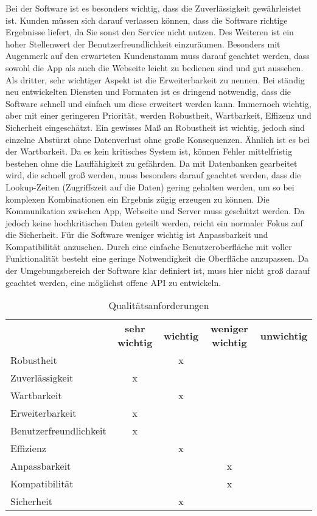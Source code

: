 ﻿Bei der Software ist es besonders wichtig, dass die Zuverlässigkeit gewährleistet ist.
Kunden müssen sich darauf verlassen können, dass die Software richtige Ergebnisse liefert, da Sie sonst den Service nicht nutzen.
Des Weiteren  ist ein hoher Stellenwert der Benutzerfreundlichkeit einzuräumen.
Besonders mit Augenmerk auf den erwarteten Kundenstamm muss darauf geachtet werden, dass sowohl die App als auch die Webseite leicht zu bedienen sind und gut aussehen.
Als dritter, sehr wichtiger Aspekt ist die Erweiterbarkeit zu nennen.
Bei ständig neu entwickelten Diensten und Formaten ist es dringend notwendig, dass die Software schnell und einfach um diese erweitert werden kann.
Immernoch wichtig, aber mit einer geringeren Priorität, werden Robustheit, Wartbarkeit, Effizenz und Sicherheit eingeschätzt.
Ein gewisses Maß an Robustheit ist wichtig, jedoch sind einzelne Abstürzt ohne Datenverlust ohne große Konsequenzen.
Ähnlich ist es bei der Wartbarkeit.
Da es kein kritisches System ist, können Fehler mittelfristig bestehen ohne die Lauffähigkeit zu gefährden.
Da mit Datenbanken gearbeitet wird, die schnell groß werden, muss besonders darauf geachtet werden, dass die Lookup-Zeiten (Zugriffszeit auf die Daten) gering gehalten werden, um so bei komplexen Kombinationen ein Ergebnis zügig erzeugen zu können.
Die Kommunikation zwischen App, Webseite und Server muss geschützt werden.
Da jedoch keine hochkritischen Daten geteilt werden, reicht ein normaler Fokus auf die Sicherheit.
Für die Software weniger wichtig ist Anpassbarkeit und Kompatibilität anzusehen.
Durch eine einfache Benutzeroberfläche mit voller Funktionalität besteht eine geringe Notwendigkeit die Oberfläche anzupassen.
Da der Umgebungsbereich der Software klar definiert ist, muss hier nicht groß darauf geachtet werden, eine möglichst offene API zu entwickeln.


\begin{table}[h]
	\centering
	\begin{tabularx}{\textwidth}{l c c c c}
		\rowcolor[HTML]{C0C0C0}
		& \textbf{sehr wichtig} & \textbf{wichtig} & \textbf{weniger wichtig} & \textbf{unwichtig} \\
		Robustheit &  & x  &  &  \\
		\rowcolor[HTML]{E7E7E7}
		Zuverlässigkeit & x &  &  &  \\
		Wartbarkeit &  & x &  &  \\
		\rowcolor[HTML]{E7E7E7}
		Erweiterbarkeit & x &  &  &  \\
		Benutzerfreundlichkeit & x &  &  &  \\
		\rowcolor[HTML]{E7E7E7}
		Effizienz &  & x &  &  \\
		Anpassbarkeit &  &  & x &  \\
		\rowcolor[HTML]{E7E7E7}
		Kompatibilität &  & & x  &  \\
		Sicherheit &  &  x & &
	\end{tabularx}
	\caption{Qualitätsanforderungen}
	\label{tabelle:qualitaetsanforderungen}
\end{table}
